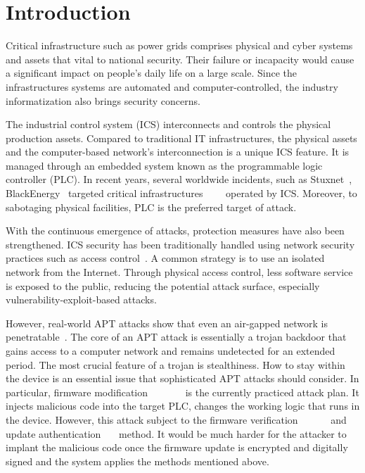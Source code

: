 \section{Introduction}
\label{sec:implant-introduction}

Critical infrastructure such as power grids comprises physical and cyber systems and assets that vital to national security. Their failure or incapacity would cause a significant impact on people's daily life on a large scale. Since the infrastructures systems are automated and computer-controlled, the industry informatization also brings security concerns. 

The industrial control system (ICS) interconnects and controls the physical production assets.  Compared to traditional IT infrastructures, the physical assets and the computer-based network's interconnection is a unique ICS feature. It is managed through an embedded system known as the programmable logic controller (PLC). In recent years, several worldwide incidents, such as Stuxnet~\cite{langner2011stuxnet}, BlackEnergy~\cite{cherepanov2016blackenergy} targeted critical infrastructures~\cite{case2016analysis}~\cite{soltan2016power}~\cite{zhang2013time}~\cite{williams2016power} operated by ICS. Moreover, to sabotaging physical facilities, PLC is the preferred target of attack.

With the continuous emergence of attacks, protection measures have also been strengthened. ICS security has been traditionally handled using network security practices such as access control~\cite{etigowni2016cpac}. A common strategy is to use an isolated network from the Internet. Through physical access control, less software service is exposed to the public, reducing the potential attack surface, especially vulnerability-exploit-based attacks. 

However, real-world APT attacks show that even an air-gapped network is penetratable~\cite{langner2011stuxnet}. The core of an APT attack is essentially a trojan backdoor that gains access to a computer network and remains undetected for an extended period. The most crucial feature of a trojan is stealthiness. How to stay within the device is an essential issue that sophisticated APT attacks should consider. In particular, firmware modification~\cite{garcia2017hey}~\cite{newman2011scada}~\cite{basnight2013firmware}~\cite{blanco2012one}~\cite{cui2013firmware}~\cite{konstantinou2015impact}~\cite{schulz2017nexmon} is the currently practiced attack plan. It injects malicious code into the target PLC, changes the working logic that runs in the device. However, this attack subject to the firmware verification~\cite{mcminn2012firmware}~\cite{wang2015confirm}~\cite{lee2016binding}~\cite{li2011viper}~\cite{seshadri2004swatt}~\cite{li2010sbap} and update authentication~\cite{lee2017blockchain}~\cite{moran2019firmware}~\cite{choi2016secure} method. It would be much harder for the attacker to implant the malicious code once the firmware update is encrypted and digitally signed and the system applies the methods mentioned above.
 

